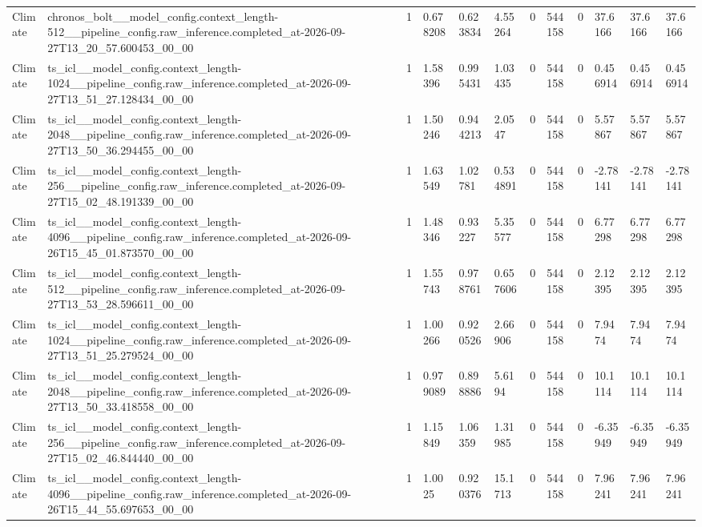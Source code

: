 \begin{tabular}{llllllllllll}
Climate & chronos\_bolt\_\_model\_config.context\_length-512\_\_pipeline\_config.raw\_inference.completed\_at-2026-09-27T13\_20\_57.600453\_00\_00 & 1 & 0.678208 & 0.623834 & 4.55264 & 0 & 544158 & 0 & 37.6166 & 37.6166 & 37.6166 \\
Climate & ts\_icl\_\_model\_config.context\_length-1024\_\_pipeline\_config.raw\_inference.completed\_at-2026-09-27T13\_51\_27.128434\_00\_00 & 1 & 1.58396 & 0.995431 & 1.03435 & 0 & 544158 & 0 & 0.456914 & 0.456914 & 0.456914 \\
Climate & ts\_icl\_\_model\_config.context\_length-2048\_\_pipeline\_config.raw\_inference.completed\_at-2026-09-27T13\_50\_36.294455\_00\_00 & 1 & 1.50246 & 0.944213 & 2.0547 & 0 & 544158 & 0 & 5.57867 & 5.57867 & 5.57867 \\
Climate & ts\_icl\_\_model\_config.context\_length-256\_\_pipeline\_config.raw\_inference.completed\_at-2026-09-27T15\_02\_48.191339\_00\_00 & 1 & 1.63549 & 1.02781 & 0.534891 & 0 & 544158 & 0 & -2.78141 & -2.78141 & -2.78141 \\
Climate & ts\_icl\_\_model\_config.context\_length-4096\_\_pipeline\_config.raw\_inference.completed\_at-2026-09-26T15\_45\_01.873570\_00\_00 & 1 & 1.48346 & 0.93227 & 5.35577 & 0 & 544158 & 0 & 6.77298 & 6.77298 & 6.77298 \\
Climate & ts\_icl\_\_model\_config.context\_length-512\_\_pipeline\_config.raw\_inference.completed\_at-2026-09-27T13\_53\_28.596611\_00\_00 & 1 & 1.55743 & 0.978761 & 0.657606 & 0 & 544158 & 0 & 2.12395 & 2.12395 & 2.12395 \\
Climate & ts\_icl\_\_model\_config.context\_length-1024\_\_pipeline\_config.raw\_inference.completed\_at-2026-09-27T13\_51\_25.279524\_00\_00 & 1 & 1.00266 & 0.920526 & 2.66906 & 0 & 544158 & 0 & 7.9474 & 7.9474 & 7.9474 \\
Climate & ts\_icl\_\_model\_config.context\_length-2048\_\_pipeline\_config.raw\_inference.completed\_at-2026-09-27T13\_50\_33.418558\_00\_00 & 1 & 0.979089 & 0.898886 & 5.6194 & 0 & 544158 & 0 & 10.1114 & 10.1114 & 10.1114 \\
Climate & ts\_icl\_\_model\_config.context\_length-256\_\_pipeline\_config.raw\_inference.completed\_at-2026-09-27T15\_02\_46.844440\_00\_00 & 1 & 1.15849 & 1.06359 & 1.31985 & 0 & 544158 & 0 & -6.35949 & -6.35949 & -6.35949 \\
Climate & ts\_icl\_\_model\_config.context\_length-4096\_\_pipeline\_config.raw\_inference.completed\_at-2026-09-26T15\_44\_55.697653\_00\_00 & 1 & 1.0025 & 0.920376 & 15.1713 & 0 & 544158 & 0 & 7.96241 & 7.96241 & 7.96241 \\

\end{tabular}
